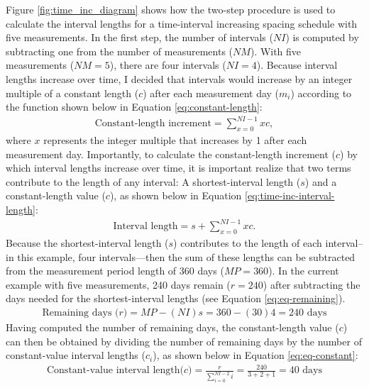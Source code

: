 \documentclass[
12pt, %
twoside,
english]{guelphthesis}
\begin{document}
Figure \ref{fig:time_inc_diagram} shows how the two-step procedure is used to calculate the interval lengths for a time-interval increasing spacing schedule with five measurements. In the first step, the number of intervals (\(NI\)) is computed by subtracting one from the number of measurements (\(NM\)). With five measurements (\(NM = 5\)), there are four intervals (\(NI = 4\)). Because interval lengths increase over time, I decided that intervals would increase by an integer multiple of a constant length (\(c\)) after each measurement day (\(m_i\)) according to the function shown below in Equation \ref{eq:constant-length}:
\begin{align}
\text{Constant-length increment} = \sum^{NI - 1}_{x=0} xc, 
  \label{eq:constant-length} 
\end{align}
where \(x\) represents the integer multiple that increases by 1 after each measurement day. Importantly, to calculate the constant-length increment (\(c\)) by which interval lengths increase over time, it is important realize that two terms contribute to the length of any interval: A shortest-interval length (\(s\)) and a constant-length value (\(c\)), as shown below in Equation \ref{eq:time-inc-interval-length}:
\begin{align}
\text{Interval length} = s + \sum^{NI - 1}_{x=0} xc. 
  \label{eq:time-inc-interval-length} 
\end{align}
\noindent Because the shortest-interval length (\(s\)) contributes to the length of each interval--in this example, four intervals---then the sum of these lengths can be subtracted from the measurement period length of 360 days (\(MP = 360\)). In the current example with five measurements, 240 days remain (\(r = 240\)) after subtracting the days needed for the shortest-interval lengths (see Equation \ref{eq:eq-remaining}).
\begin{align}
\text{Remaining days (} \textit{r})  = MP - (NI)s = 360 - (30)4 = 240 \text{ days}
  \label{eq:eq-remaining} 
\end{align}
\noindent Having computed the number of remaining days, the constant-length value (\(c\)) can then be obtained by dividing the number of remaining days by the number of constant-value interval lengths (\(c_i\)), as shown below in Equation \ref{eq:eq-constant}:
\begin{align}
\text{Constant-value interval length(} \textit{c}\text{)} = \frac{r}{\sum^{NI - 2}_{i = 0}i} = \frac{240}{3 + 2 + 1} = \text{40 days}
  \label{eq:eq-constant} 
\end{align}
\end{document}
